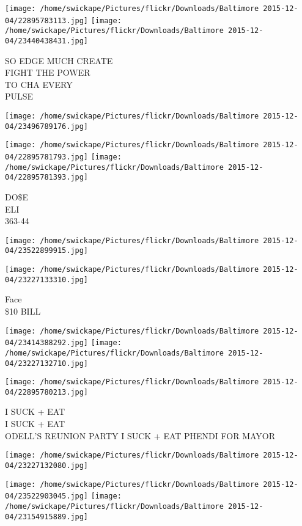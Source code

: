 \documentclass[10pt,letterpaper]{article}
\begin{document}
\texttt{[image: /home/swickape/Pictures/flickr/Downloads/Baltimore 2015-12-04/22895783113.jpg]}
\texttt{[image: /home/swickape/Pictures/flickr/Downloads/Baltimore 2015-12-04/23440438431.jpg]}

SO EDGE MUCH CREATE\\
FIGHT THE POWER\\
TO CHA EVERY\\
PULSE
\pagebreak

\texttt{[image: /home/swickape/Pictures/flickr/Downloads/Baltimore 2015-12-04/23496789176.jpg]}

\vspace{0.25in}
\texttt{[image: /home/swickape/Pictures/flickr/Downloads/Baltimore 2015-12-04/22895781793.jpg]}
\texttt{[image: /home/swickape/Pictures/flickr/Downloads/Baltimore 2015-12-04/22895781393.jpg]}

DO\$E\\
ELI\\
363{-}44
\pagebreak

\texttt{[image: /home/swickape/Pictures/flickr/Downloads/Baltimore 2015-12-04/23522899915.jpg]}

\vspace{0.25in}
\texttt{[image: /home/swickape/Pictures/flickr/Downloads/Baltimore 2015-12-04/23227133310.jpg]}

Face\\
\$10 BILL
\pagebreak

\texttt{[image: /home/swickape/Pictures/flickr/Downloads/Baltimore 2015-12-04/23414388292.jpg]}
\texttt{[image: /home/swickape/Pictures/flickr/Downloads/Baltimore 2015-12-04/23227132710.jpg]}

\vspace{0.25in}
\texttt{[image: /home/swickape/Pictures/flickr/Downloads/Baltimore 2015-12-04/22895780213.jpg]}

I SUCK + EAT\\
I SUCK + EAT\\
ODELL'S REUNION PARTY I SUCK + EAT PHENDI FOR MAYOR
\pagebreak

\texttt{[image: /home/swickape/Pictures/flickr/Downloads/Baltimore 2015-12-04/23227132080.jpg]}

\vspace{0.25in}
\texttt{[image: /home/swickape/Pictures/flickr/Downloads/Baltimore 2015-12-04/23522903045.jpg]}
\texttt{[image: /home/swickape/Pictures/flickr/Downloads/Baltimore 2015-12-04/23154915889.jpg]}
\end{document}
